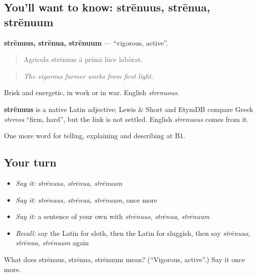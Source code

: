 \subsection*{You'll want to know: strēnuus, strēnua, strēnuum}
\textbf{strēnuus, strēnua, strēnuum} — \textquotedblleft{}vigorous, active\textquotedblright{}.

\begin{quote}
Agricola strēnuus ā prīmā lūce labōrat.
\end{quote}

\begin{quote}
\emph{The vigorous farmer works from first light.}
\end{quote}

Brisk and energetic, in work or in war. English \emph{strenuous}.

\begin{cousinweb}
\textbf{strēnuus} is a native Latin adjective; Lewis \& Short and EtymDB compare Greek \emph{stereos} \textquotedblleft{}firm, hard\textquotedblright{}, but the link is not settled. English \emph{strenuous} comes from it.
\end{cousinweb}

\begin{grammarlens}[title={What you've built}]
One more word for telling, explaining and describing at B1.
\end{grammarlens}

\subsection*{Your turn}
\begin{itemize}
\raggedright
  \item \emph{Say it:} \emph{strēnuus, strēnua, strēnuum}
  \item \emph{Say it:} \emph{strēnuus, strēnua, strēnuum}, once more
  \item \emph{Say it:} a sentence of your own with \emph{strēnuus, strēnua, strēnuum}
  \item \emph{Recall:} say the Latin for sloth, then the Latin for sluggish, then say \emph{strēnuus, strēnua, strēnuum} again
\end{itemize}

\begin{tcolorbox}[breakable,colback=teal!4,colframe=teal!35!black,title={Before you move on}]
What does strēnuus, strēnua, strēnuum mean? (\textquotedblleft{}Vigorous, active\textquotedblright{}.) Say it once more.
\end{tcolorbox}
